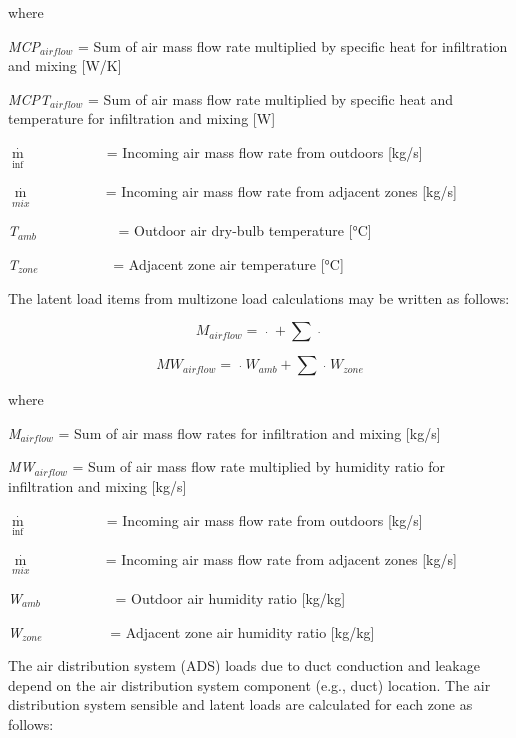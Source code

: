 where

\emph{MCP\(_{airflow}\)} = Sum of air mass flow rate multiplied by specific heat for infiltration and mixing {[}W/K{]}

\emph{MCPT\(_{airflow}\)} = Sum of air mass flow rate multiplied by specific heat and temperature for infiltration and mixing {[}W{]}

\({\mathop m\limits^\cdot_{\inf }}\) ~~~~~~~~~~ = Incoming air mass flow rate from outdoors {[}kg/s{]}

\({\mathop m\limits^\cdot_{mix}}\) ~~~~~~~~~ = Incoming air mass flow rate from adjacent zones {[}kg/s{]}

\emph{T\(_{amb}\)}~~~~~~~~~~~ = Outdoor air dry-bulb temperature {[}°C{]}

\emph{T\(_{zone}\)}~~~~~~~~~~ = Adjacent zone air temperature {[}°C{]}

The latent load items from multizone load calculations may be written as follows:

\begin{equation}
{M_{airflow}} = \mathop {{m_{\inf }}}\limits^\cdot   + \sum {\mathop {{m_{mix}}}\limits^\cdot  }
\end{equation}

\begin{equation}
M{W_{airflow}} = \mathop {{m_{\inf }}}\limits^\cdot  {W_{amb}} + \sum {\mathop {{m_{mix}}}\limits^\cdot  } {W_{zone}}
\end{equation}

where

\emph{M\(_{airflow}\)} = Sum of air mass flow rates for infiltration and mixing {[}kg/s{]}

\emph{MW\(_{airflow}\)} = Sum of air mass flow rate multiplied by humidity ratio for infiltration and mixing {[}kg/s{]}

\({\mathop m\limits^\cdot_{\inf }}\) ~~~~~~~~~~ = Incoming air mass flow rate from outdoors {[}kg/s{]}

\({\mathop m\limits^\cdot_{mix}}\) ~~~~~~~~~ = Incoming air mass flow rate from adjacent zones {[}kg/s{]}

\emph{W\(_{amb}\)}~~~~~~~~~~ = Outdoor air humidity ratio {[}kg/kg{]}

\emph{W\(_{zone}\)}~~~~~~~~~ = Adjacent zone air humidity ratio {[}kg/kg{]}

The air distribution system (ADS) loads due to duct conduction and leakage depend on the air distribution system component (e.g., duct) location. The air distribution system sensible and latent loads are calculated for each zone as follows:

